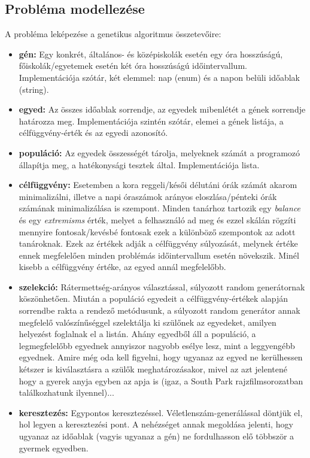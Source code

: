 \documentclass[12pt,a4paper]{report}
\begin{document}
\subsection{Probléma modellezése}

\noindent A probléma leképezése a genetikus algoritmus összetevőire:

\begin{itemize}
    \item \textbf{gén:} Egy konkrét, általános- és középiskolák esetén egy óra hosszúságú, 	          főiskolák/egyetemek esetén két óra hosszúságú időintervallum. Implementációja szótár, két elemmel: nap (enum) és a napon belüli időablak (string).
    \item \textbf{egyed:} Az összes időablak sorrendje, az egyedek mibenlétét a gének sorrendje határozza meg. Implementációja szintén szótár, elemei a gének listája, a célfüggvény-érték és az
egyedi azonosító.
    \item \textbf{populáció:} Az egyedek összességét tárolja, melyeknek számát a programozó állapítja meg, a hatékonysági tesztek által. Implementációja lista.
    \item \textbf{célfüggvény:} Esetemben a kora reggeli/késői délutáni órák számát akarom minimalizálni, illetve a napi óraszámok arányos eloszlása/pénteki órák számának minimalizálása is szempont. Minden tanárhoz tartozik egy \textsl{balance} és egy \textsl{extremisms} érték,
melyet a felhasználó ad meg és ezzel skálán rögzíti mennyire fontosak/kevésbé fontosak ezek a különböző szempontok az adott tanároknak. Ezek az értékek adják a célfüggvény súlyozását, melynek értéke ennek megfelelően minden problémás időintervallum esetén növekszik. Minél kisebb a célfüggvény értéke, az egyed annál megfelelőbb.
    \item \textbf{szelekció:} Rátermettség-arányos választással, súlyozott random generátornak köszönhetően. Miután a populáció egyedeit a célfüggvény-értékek alapján sorrendbe rakta a rendező metódusunk, a súlyozott random generátor annak megfelelő valószínűséggel szelektálja ki szülőnek az egyedeket, amilyen helyezést foglalnak el a listán. Ahány egyedből áll a populáció, a legmegfelelőbb egyednek annyiszor nagyobb esélye lesz, mint a leggyengébb egyednek. Amire még oda kell figyelni, hogy ugyanaz az egyed ne kerülhessen kétszer is kiválasztásra a szülők meghatározásakor, mivel az azt jelentené hogy a gyerek anyja egyben az apja is (igaz, a South Park rajzfilmsorozatban találkozhatunk ilyennel)...
    \item \textbf{keresztezés:} Egypontos keresztezéssel. Véletlenszám-generálással döntjük el, hol legyen a keresztezési pont. A nehézséget annak megoldása jelenti, hogy ugyanaz az időablak (vagyis ugyanaz a gén) ne fordulhasson elő többször a gyermek egyedben.
\end{itemize}
\end{document}
